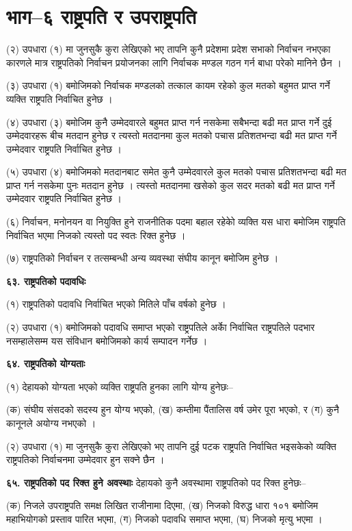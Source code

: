 \section{भाग–६ राष्ट्रपति र उपराष्ट्रपति}

(२) उपधारा (१) मा जुनसुकै कुरा लेखिएको भए तापनि कुनै प्रदेशमा प्रदेश सभाको निर्वाचन नभएका कारणले मात्र राष्ट्रपतिको निर्वाचन
प्रयोजनका लागि निर्वाचक मण्डल गठन गर्न बाधा परेको मानिने छैन ।

(३) उपधारा (१) बमोजिमको निर्वाचक मण्डलको तत्काल कायम रहेको कुल मतको बहुमत प्राप्त गर्ने व्यक्ति राष्ट्रपति निर्वाचित हुनेछ ।

(४) उपधारा (३) बमोजिम कुनै उम्मेदवारले बहुमत प्राप्त गर्न नसकेमा सबैभन्दा बढी मत प्राप्त गर्ने दुई उम्मेदवारहरू बीच मतदान हुनेछ
र त्यस्तो मतदानमा कुल मतको पचास प्रतिशतभन्दा बढी मत प्राप्त गर्ने उम्मेदवार राष्ट्रपति निर्वाचित हुनेछ ।

(५) उपधारा (४) बमोजिमको मतदानबाट समेत कुनै उम्मेदवारले कुल मतको पचास प्रतिशतभन्दा बढी मत प्राप्त गर्न नसकेमा पुनः मतदान हुनेछ । त्यस्तो मतदानमा खसेको कुल सदर मतको बढी मत प्राप्त गर्ने उम्मेदवार राष्ट्रपति निर्वाचित हुनेछ ।

(६) निर्वाचन, मनोनयन वा नियुक्ति हुने राजनीतिक पदमा बहाल रहेकोे व्यक्ति यस धारा बमोजिम राष्ट्रपति निर्वाचित भएमा निजको त्यस्तो पद स्वतः रिक्त हुनेछ ।

(७) राष्ट्रपतिको निर्वाचन र तत्सम्बन्धी अन्य व्यवस्था संघीय कानून बमोजिम हुनेछ ।

\textbf{६३. राष्ट्रपतिको पदावधिः}

(१) राष्ट्रपतिको पदावधि निर्वाचित भएको मितिले पाँच वर्षको हुनेछ ।

(२) उपधारा (१) बमोजिमको पदावधि समाप्त भएको राष्ट्रपतिले अर्काे निर्वाचित राष्ट्रपतिले पदभार नसम्हालेसम्म यस संविधान बमोजिमको कार्य सम्पादन गर्नेछ ।

\textbf{६४. राष्ट्रपतिको योग्यताः}

(१) देहायको योग्यता भएको व्यक्ति राष्ट्रपति हुनका लागि योग्य हुनेछः–

(क) संघीय संसदको सदस्य हुन योग्य भएको,
(ख) कम्तीमा पैंतालिस वर्ष उमेर पूरा भएको, र
(ग) कुनै कानूनले अयोग्य नभएको ।

(२) उपधारा (१) मा जुनसुकै कुरा लेखिएको भए तापनि दुई पटक राष्ट्रपति निर्वाचित भइसकेको व्यक्ति राष्ट्रपतिको निर्वाचनमा उम्मेदवार हुन सक्ने छैन ।

\textbf{६५. राष्ट्रपतिको पद रिक्त हुने अवस्थाः} देहायको कुनै अवस्थामा राष्ट्रपतिको पद रिक्त हुनेछः–

(क) निजले उपराष्ट्रपति समक्ष लिखित राजीनामा दिएमा,
(ख) निजको विरुद्ध धारा १०१ बमोजिम महाभियोगको प्रस्ताव पारित भएमा,
(ग) निजको पदावधि समाप्त भएमा,
(घ) निजको मृत्यु भएमा ।

